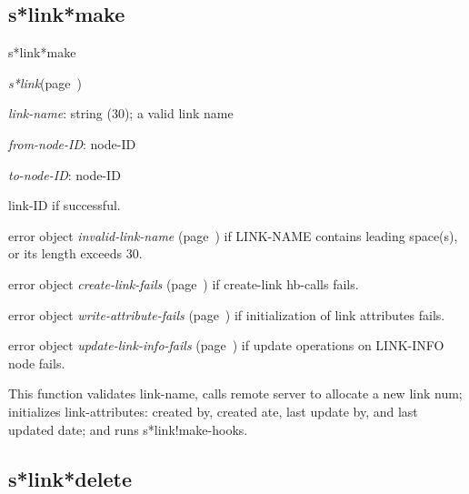 \subsection{s*link*make}
\label{s*link*make}

\begin{description}
\item [Name:]  s*link*make

\item [Class:] {\sl s*link}\hfill(page~\pageref{s*link})

\item [Parameters:]
\item {\sl link-name}:  string (30); a valid link name

\item {\sl from-node-ID}:  node-ID

\item {\sl to-node-ID}:  node-ID




\item [Return-value:]
link-ID if successful.

error object {\sl invalid-link-name} (page~\pageref{invalid-link-name}) if LINK-NAME
contains leading space(s), or its length exceeds 30.

error object {\sl create-link-fails} (page~\pageref{create-link-fails}) if create-link
hb-calls fails. 

error object {\sl write-attribute-fails} (page~\pageref{write-attribute-fails}) if
initialization of link attributes fails.

error object {\sl update-link-info-fails} (page~\pageref{update-link-info-fails}) if update 
operations on LINK-INFO node fails.

\item [Description:]
This function validates link-name, calls remote server
to allocate a new link num; initializes
link-attributes: created by, created ate, last update
by, and last updated date; and runs s*link!make-hooks. 

\item [Public:]





\end{description}
\horizontalline

\subsection{s*link*delete}
\label{s*link*delete}

